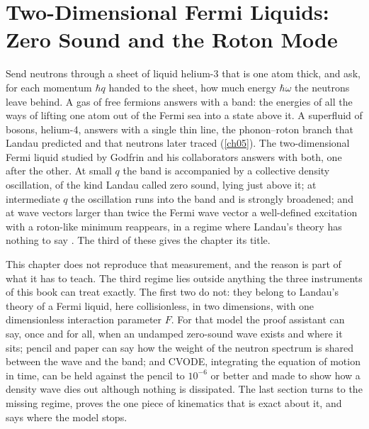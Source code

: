 \chapter{Two-Dimensional Fermi Liquids: Zero Sound and the Roton Mode}\label{ch08}

\providecommand{\ceightV}[1]{\ifcsname ceight@#1\endcsname\csname ceight@#1\endcsname\else\PackageError{ch08}{Undefined number key #1}{Run figures/ch08_numbers_tex.py}\fi}
\providecommand{\ceightavg}[1]{\left\langle #1\right\rangle}
\renewcommand{\topfraction}{0.88}\renewcommand{\textfraction}{0.08}\renewcommand{\floatpagefraction}{0.75}\setcounter{topnumber}{3}

Send neutrons through a sheet of liquid helium-3 that is one atom thick, and ask, for each momentum $\hbar q$ handed to the sheet, how much energy $\hbar\omega$ the neutrons leave behind.
A gas of free fermions answers with a band: the energies of all the ways of lifting one atom out of the Fermi sea into a state above it.
A superfluid of bosons, helium-4, answers with a single thin line, the phonon--roton branch that Landau predicted and that neutrons later traced (\cref{ch05}).
The two-dimensional Fermi liquid studied by Godfrin and his collaborators answers with both, one after the other.
At small $q$ the band is accompanied by a collective density oscillation, of the kind Landau called zero sound, lying just above it; at intermediate $q$ the oscillation runs into the band and is strongly broadened; and at wave vectors larger than twice the Fermi wave vector a well-defined excitation with a roton-like minimum reappears, in a regime where Landau's theory has nothing to say \cite{Godfrin2010,Godfrin2012}.
The third of these gives the chapter its title.

This chapter does not reproduce that measurement, and the reason is part of what it has to teach.
The third regime lies outside anything the three instruments of this book can treat exactly.
The first two do not: they belong to Landau's theory of a Fermi liquid, here collisionless, in two dimensions, with one dimensionless interaction parameter $F$.
For that model the proof assistant can say, once and for all, when an undamped zero-sound wave exists and where it sits; pencil and paper can say how the weight of the neutron spectrum is shared between the wave and the band; and CVODE, integrating the equation of motion in time, can be held against the pencil to $10^{-6}$ or better and made to show how a density wave dies out although nothing is dissipated.
The last section turns to the missing regime, proves the one piece of kinematics that is exact about it, and says where the model stops.

